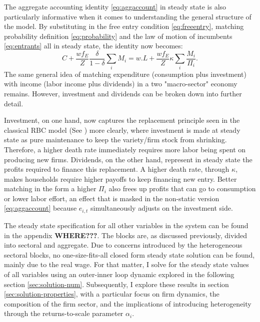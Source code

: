 \documentclass[a4paper,12pt]{article} %
\numberwithin{equation}{section} %
\numberwithin{figure}{section}
\numberwithin{table}{section}
\begin{document}
The aggregate accounting identity \eqref{eq:aggaccount} in steady state is also particularly informative when it
comes to understanding the general structure of the model. By substituting in the free entry condition 
\eqref{eq:freeentry}, matching probability definition \eqref{eq:probability} and the law of motion of incumbents \eqref{eq:entrants} all
in steady state, the identity now becomes:
\begin{equation}
C + \frac{w f_E}{Z}\frac{\delta}{1-\delta}\sum_iM_{i}= w.L + \frac{w f_E}{Z}\kappa \sum_i\frac{M_i}{\Pi_i}. \label{aggsteadystate} 
\end{equation}
The same general idea of matching expenditure (consumption plus investment) with income (labor income plus dividends)
in a two "macro-sector" economy remains. However, investment and dividends can be broken down into further detail. 

Investment, on one hand, now captures the replacement principle seen in the classical RBC model 
(See \cite{campbell1994inspecting}) more clearly, where investment is made at steady state as pure maintenance to keep the variety/firm stock from shrinking. Therefore,
a higher death rate immediately requires more labor being spent on producing new firms. Dividends, on the other hand, represent in
steady state the profits required to finance this replacement. A higher death rate, through $\kappa$, makes households require 
higher payoffs to keep financing new entry. Better matching in the form a higher $\Pi_i$ also frees up profits that can go to 
consumption or lower labor effort, an effect that is masked in the non-static version \eqref{eq:aggaccount} because $e_{i,t}$ 
simultaneously adjusts on the investment side.

The steady state specification for all other variables in the system can be found in the appendix \textbf{WHERE???}. The blocks are,
as discussed previously, divided into sectoral and aggregate. Due to concerns introduced by the heterogeneous sectoral blocks, no
one-size-fits-all closed form steady state solution can be found, mainly due to the real wage. For that matter, I solve for the
steady state values of all variables using an outer-inner loop dynamic explored in the following section \ref{sec:solution-num}.
Subsequently, I explore these results in section \ref{sec:solution-properties}, with a particular focus on firm dynamics, the
composition of the firm sector, and the implications of introducing heterogeneity through the returns-to-scale parameter $\alpha_i$.
\end{document}
